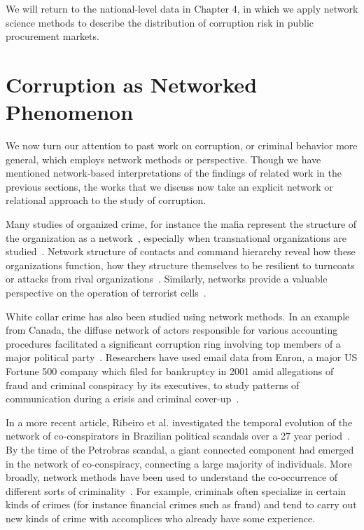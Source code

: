 We will return to the national-level data in Chapter 4, in which we apply network science methods to describe the distribution of corruption risk in public procurement markets.

\section{Corruption as Networked Phenomenon}
We now turn our attention to past work on corruption, or criminal behavior more general, which employs network methods or perspective. Though we have mentioned network-based interpretations of the findings of related work in the previous sections, the works that we discuss now take an explicit network or relational approach to the study of corruption.

Many studies of organized crime, for instance the mafia represent the structure of the organization as a network~\cite{gambetta1996sicilian,calderoni2011strategic}, especially when transnational organizations are studied~\cite{williams2001transnational}. Network structure of contacts and command hierarchy reveal how these organizations function, how they structure themselves to be resilient to turncoats or attacks from rival organizations~\cite{agreste2016network,dellaposta2017network}. Similarly, networks provide a valuable perspective on the operation of terrorist cells~\cite{krebs2002mapping}.

White collar crime has also been studied using network methods. In an example from Canada, the diffuse network of actors responsible for various accounting procedures facilitated a significant corruption ring involving top members of a major political party~\cite{neu2013accounting}. Researchers have used email data from Enron, a major US Fortune 500 company which filed for bankruptcy in 2001 amid allegations of fraud and criminal conspiracy by its executives, to study patterns of communication during a crisis and criminal cover-up~\cite{diesner2005communication}.

In a more recent article, Ribeiro et al. investigated the temporal evolution of the network of co-conspirators in Brazilian political scandals over a 27 year period~\cite{ribeiro2018dynamical}. By the time of the Petrobras scandal, a giant connected component had emerged in the network of co-conspiracy, connecting a large majority of individuals. More broadly, network methods have been used to understand the co-occurrence of different sorts of criminality~\cite{tumminello2013phenomenology,rostami2015complexity}. For example, criminals often specialize in certain kinds of crimes (for instance financial crimes such as fraud) and tend to carry out new kinds of crime with accomplices who already have some experience. 
